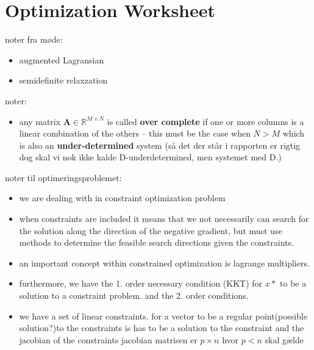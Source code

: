 \chapter*{Optimization Worksheet}
noter fra møde:
\begin{itemize}
\item augmented Lagransian
\item semidefinite relaxzation 
\end{itemize}

noter:
\begin{itemize}
\item any matrix $\textbf{A}\in \mathbb{R}^{M\times N}$ is called \textbf{over complete} if one or more columns is a linear combination of the others -- this must be the case when $N>M$ which is also an \textbf{under-determined} system (så det der står i rapporten er rigtig dog skal vi nok ikke kalde D-underdetermined, men systemet med D.)
\end{itemize}

noter til optimeringsproblemet: 
\begin{itemize}
\item we are dealing with in constraint optimization problem
\item when constraints are included it means that we not necessarily can search for the solution along the direction of the negative gradient, but must use methods to determine the feasible search directions given the constraints.
\item an important concept within constrained optimization is lagrange multipliers. 
\item furthermore, we have the 1. order necessary condition (KKT) for $x*$ to be a solution to a constraint problem. and the 2. order conditions.
\item we have a set of linear constraints. for a vector to be a regular point(possible solution?)to the constraints is has to be a solution to the constraint and the jacobian of the constraints jacobian matrisen er $p \times n $ hvor $p<n$ skal gælde 
\end{itemize}